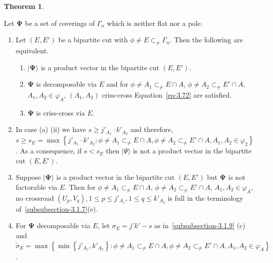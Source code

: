 \documentclass[a4paper,12pt]{article}
\theoremstyle{definition}
\theoremstyle{underlinethm}
\newtheorem{thm}{Theorem}[section]
\theoremstyle{definition}
\begin{document}
\begin{thm}\label{thm-3.9}

Let $\boldsymbol{\Psi}$ be a set of coverings of $\Gamma_{n}$ which is neither flat nor a pole.

\end{thm}

\begin{enumerate}[label=(\alph*)]
\item Let $(E, E')$ be a bipartite cut with $\phi \neq E \subset_{\neq} \Gamma_{n}$. Then the following are equivalent.
 \begin{enumerate}[label=(\roman*)]
\item $| \boldsymbol{\Psi} \rangle$ is a product vector in the bipartite cut $(E, E')$.

\item $\boldsymbol{\Psi}$ is decomposable via $E$ and for $\phi \neq A_{1} \subset_{\neq} E \cap A$, $\phi \neq A_{2} \subset_{\neq}  E' \cap A$, $A_{1}, A_{2} \in \varphi_{A}$, $(A_{1}, A_{2})$ criss-cross Equation~\eqref{eq-3.72} are satisfied.

\item $\boldsymbol{\Psi}$ is criss-cross via $E$.
 \end{enumerate}

\item In case (a) (ii) we have $s \geq j'_{A_{1}} \cdot k'_{A_{2}}$ and therefore,\\ $s \geq s_{E} = \max\left\{j'_{A_{1}} \cdot k'_{A_{2}} : \phi \neq A_{1} \subset_{\neq} E \cap A, \phi\neq A_{2} \subset_{\neq} E' \cap A, A_{1}, A_{2} \in \varphi_{2} \right\}$. As a consequence, if $s < s_{E}$ then $| \Psi \rangle$ is not a product vector in the bipartite cut $(E, E')$. 

\item Suppose $| \boldsymbol{\Psi} \rangle$ is a product vector in the bipartite cut $(E, E')$ but $\boldsymbol{\Psi}$ is not factorable via $E$. Then for $\phi \neq A_{1} \subset_{\neq} E \cap A$, $\phi \neq A_{2} \subset_{\neq} E' \cap A$, $A_{1}, A_{2} \in \varphi_{A}$, no crossroad $\left(U_{p}, V_{q}\right), 1 \leq p \leq j'_{A_{1}}, 1 \leq q \leq k'_{A_{2}}$ is full in the terminology of~\eqref{subsubsection-3.1.7}(e).

\item For $\boldsymbol{\Psi}$ decomposable via $E$, let $\sigma_{E} = j'k'-s$ as in~\eqref{subsubsection-3.1.9} (c) and $\widetilde{\sigma}_{E} = \max \left\{\min \left\{j'_{A_{1}}, k'_{A_{2}}\right\} : \phi \neq A_{1} \subset_{\neq} E \cap A, \phi \neq A_{2} \subset_{\neq} E' \cap A, A_{1}, A_{2} \in \varphi_{A} \right\}$.


\end{enumerate}
\end{document}
